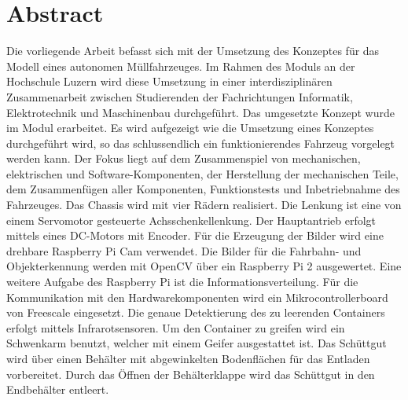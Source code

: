 \section*{Abstract}
Die vorliegende Arbeit befasst sich mit der Umsetzung des Konzeptes für das Modell eines autonomen Müllfahrzeuges. Im Rahmen des Moduls \grqq an der Hochschule Luzern wird diese Umsetzung in einer interdisziplinären Zusammenarbeit zwischen Studierenden der Fachrichtungen Informatik, Elektrotechnik und Maschinenbau durchgeführt. Das umgesetzte Konzept wurde im Modul \grqq erarbeitet. Es wird aufgezeigt wie die Umsetzung eines Konzeptes durchgeführt wird, so das schlussendlich ein funktionierendes Fahrzeug vorgelegt werden kann. Der Fokus liegt auf dem Zusammenspiel von mechanischen, elektrischen und Software-Komponenten, der Herstellung der mechanischen Teile, dem Zusammenfügen aller Komponenten, Funktionstests und Inbetriebnahme des Fahrzeuges. Das Chassis wird mit vier Rädern realisiert. Die Lenkung ist eine von einem Servomotor gesteuerte Achsschenkellenkung. Der Hauptantrieb erfolgt mittels eines DC-Motors mit Encoder. Für die Erzeugung der Bilder wird eine drehbare Raspberry Pi Cam verwendet. Die Bilder für die Fahrbahn- und Objekterkennung werden mit OpenCV über ein Raspberry Pi 2 ausgewertet. Eine weitere Aufgabe des Raspberry Pi ist die Informationsverteilung. Für die Kommunikation mit den Hardwarekomponenten wird ein Mikrocontrollerboard von Freescale eingesetzt. Die genaue Detektierung des zu leerenden Containers erfolgt mittels Infrarotsensoren. Um den Container zu greifen wird ein Schwenkarm benutzt, welcher mit einem Geifer ausgestattet ist. Das Schüttgut wird über einen Behälter mit abgewinkelten Bodenflächen für das Entladen vorbereitet. Durch das Öffnen der Behälterklappe wird das Schüttgut in den Endbehälter entleert.
\clearpage